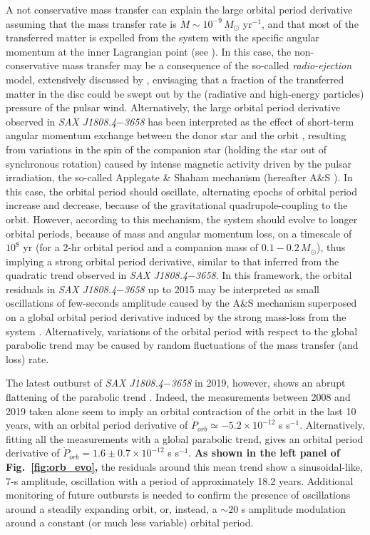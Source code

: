 \documentclass[graybox]{svmult}
\def \saxj{{\em SAX J1808.4$-$3658\xspace}}
\begin{document}
A not conservative mass transfer can explain the large orbital period derivative assuming that the mass transfer rate is $\dot M \sim 10^{-9}\, M_\odot$ yr$^{-1}$, and that most of the transferred matter is expelled from the system with the specific angular momentum at the inner Lagrangian point (see \cite{DiSalvo2008,Burderi2009}). In this case, the non-conservative mass transfer may be a consequence of the so-called \textit{radio-ejection} model, extensively discussed by \cite{Burderi2001}, envisaging that a fraction of the transferred matter in the disc could be swept out by the (radiative and high-energy particles) pressure of the pulsar wind. Alternatively, the large orbital period derivative observed in \saxj{} has been interpreted as the effect of short-term angular momentum exchange between the donor star and the orbit \cite{Hartman2009b,Patruno2012b}, resulting from variations in the spin of the companion star (holding the star out of synchronous rotation) caused by intense magnetic activity driven by the pulsar irradiation, the so-called Applegate \& Shaham mechanism (hereafter A\&S \cite{Applegate1994}). In this case, the orbital period should oscillate, alternating epochs of orbital period increase and decrease, because of the gravitational quadrupole-coupling to the orbit. However, according to this mechanism, the system should evolve to longer orbital periods, because of mass and angular momentum loss, on a timescale of $10^8$ yr (for a 2-hr orbital period and a companion mass of $0.1-0.2\, M_\odot$), thus implying a strong orbital period derivative, similar to that inferred from the quadratic trend observed in \saxj{}. In this framework, the orbital residuals in \saxj{} up to 2015 may be interpreted as small oscillations of few-seconds amplitude caused by the A\&S mechanism superposed on a global orbital period derivative induced by the strong mass-loss from the system \cite{Sanna2017c}. Alternatively, variations of the orbital period with respect to the global parabolic trend may be caused by random fluctuations of the mass transfer (and loss) rate. 

The latest outburst of \saxj{} in 2019, however, shows an abrupt flattening of the parabolic trend \cite{Bult2019c}. Indeed, the measurements between 2008 and 2019 taken alone seem to imply an orbital contraction of the orbit in the last 10 years, with an orbital period derivative of $\dot P_{orb} \simeq -5.2 \times 10^{-12}$ s s$^{-1}$. Alternatively, fitting all the measurements with a global parabolic trend, gives an orbital period derivative of $\dot P_{orb} = 1.6 \pm 0.7 \times 10^{-12}$ s s$^{-1}$. \textbf{As shown in the left panel of Fig.~\ref{fig:orb_evo},} the residuals around this mean trend show a sinusoidal-like, 7-s amplitude, oscillation with a period of approximately 18.2 years. Additional monitoring of future outbursts is needed to confirm the presence of oscillations around a steadily expanding orbit, or, instead, a $\sim 20$ s amplitude modulation around a constant (or much less variable) orbital period.
\end{document}
